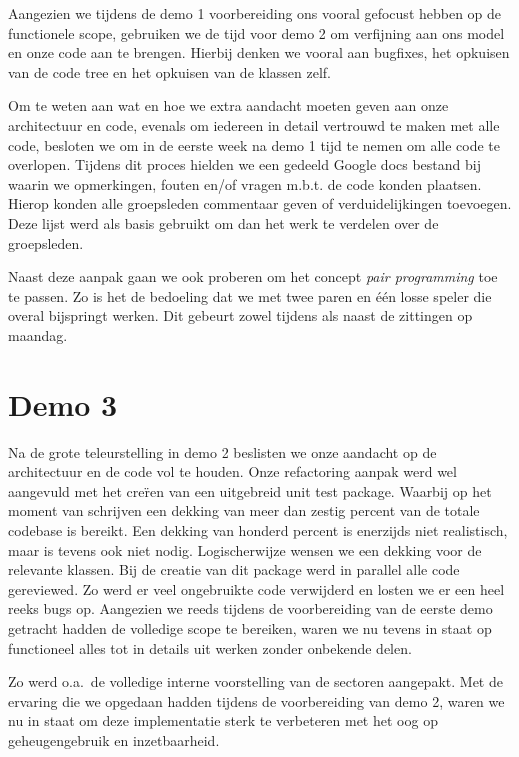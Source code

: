 \documentclass[12pt,a4paper]{report}
\begin{document}
Aangezien we tijdens de demo 1 voorbereiding ons vooral gefocust hebben op de functionele scope, gebruiken we de tijd voor demo 2 om verfijning aan ons model en onze code aan te brengen. Hierbij denken we vooral aan bugfixes, het opkuisen van de code tree en het opkuisen van de klassen zelf.

Om te weten aan wat en hoe we extra aandacht moeten geven aan onze architectuur en code, evenals om iedereen in detail vertrouwd te maken met alle code, besloten we om in de eerste week na demo 1 tijd te nemen om alle code te overlopen. Tijdens dit proces hielden we een gedeeld Google docs bestand bij waarin we opmerkingen, fouten en/of vragen m.b.t. de code konden plaatsen. Hierop konden alle groepsleden commentaar geven of verduidelijkingen toevoegen. Deze lijst werd als basis gebruikt om dan het werk te verdelen over de groepsleden.

Naast deze aanpak gaan we ook proberen om het concept \emph{pair programming} toe te passen. Zo is het de bedoeling dat we met twee paren en \'e\'en losse speler die overal bijspringt werken. Dit gebeurt zowel tijdens als naast de zittingen op maandag.

\section{Demo 3}

Na de grote teleurstelling in demo 2 beslisten we onze aandacht op de architectuur en de code vol te houden. Onze refactoring aanpak werd wel aangevuld met het cre\"ren van een uitgebreid unit test package. Waarbij op het moment van schrijven een dekking van meer dan zestig percent van de totale codebase is bereikt. Een dekking van honderd percent is enerzijds niet realistisch, maar is tevens ook niet nodig. Logischerwijze wensen we een dekking voor de relevante klassen. Bij de creatie van dit package werd in parallel alle code gereviewed. Zo werd er veel ongebruikte code verwijderd en losten we er een heel reeks bugs op. Aangezien we reeds tijdens de voorbereiding van de eerste demo getracht hadden de volledige scope te bereiken, waren we nu tevens in staat op functioneel alles tot in details uit werken zonder onbekende delen.

Zo werd o.a.\ de volledige interne voorstelling van de sectoren aangepakt. Met de ervaring die we opgedaan hadden tijdens de voorbereiding van demo 2, waren we nu in staat om deze implementatie sterk te verbeteren met het oog op geheugengebruik en inzetbaarheid.
\end{document}

